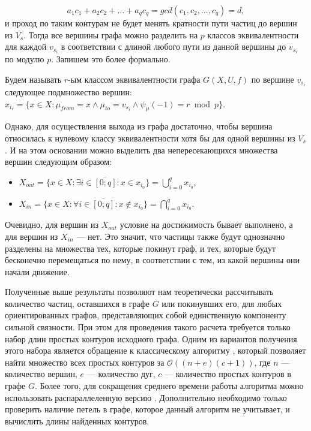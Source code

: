 \begin{equation*}
a_1c_1 + a_2c_2 + ... + a_qc_q = gcd(c_1, c_2, ... , c_q) = d,
\end{equation*}	и проход по таким контурам не будет менять кратности пути частиц до вершин из $V_s$. Тогда все вершины графа можно разделить на $p$ классов эквивалентности для каждой $v_{s_i}$ в соответствии с длиной любого пути из данной вершины до $v_{s_i}$ по модулю $p$.
Запишем это более формально.

\begin{definition}
	Будем называть $r$-ым классом эквивалентности графа $G(X, U, f)$ по вершине $v_{s_i}$ следующее подмножество вершин: $x_{i_r} = \{x \in X: \mu_{from} = x \wedge \mu_{to} = v_{s_i} \wedge \psi_\mu(-1) = r \bmod p\}$.
\end{definition}

Однако, для осуществления выхода из графа достаточно, чтобы вершина относилась к нулевому классу эквивалентности хотя бы для одной вершины из $V_s$. И на этом основании можно выделить два непересекающихся множества вершин следующим образом:

\begin{itemize}
	\item $X_{out} = \{x \in X: \exists i \in \overline{ [0; q] } : x \in x_{i_0} \} = \bigcup_{i=0}^q x_{i_0}$, 
	\item $X_{in} = \{x \in X: \forall i \in \overline{ [0; q] } : x \notin x_{i_0} \} = \bigcap_{i=0}^q x_{i_0}$.
\end{itemize}

Очевидно, для вершин из $X_{out}$ условие на достижимость бывает выполнено, а для вершин из $X_{in}$ --- нет. Это значит, что частицы также будут однозначно разделены на множества тех, которые покинут граф, и тех, которые будут бесконечно перемещаться по нему, в соответствии с тем, из какой вершины они начали движение. 

Полученные выше результаты позволяют нам теоретически рассчитывать количество частиц, оставшихся в графе $G$ или покинувших его, для любых ориентированных графов, представляющих собой единственную компоненту сильной связности. При этом для проведения такого расчета требуется только набор длин простых контуров исходного графа. Одним из вариантов получения этого набора является обращение к классическому алгоритму \cite{Cir}, который позволяет найти множество всех простых контуров за $\mathcal{O}((n + e)(c + 1))$, где $n$ --- количество вершин, $e$ --- количество дуг, $c$ --- количество простых контуров в графе $G$. Более того, для сокращения среднего времени работы алгоритма можно использовать распараллеленную версию \cite{Par}. Дополнительно необходимо только проверить наличие петель в графе, которое данный алгоритм не учитывает, и вычислить длины найденных контуров. 

